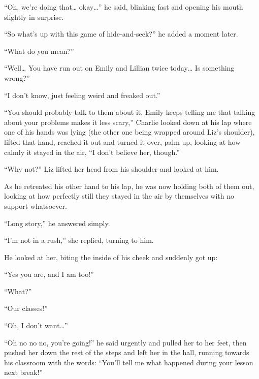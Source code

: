 “Oh, we’re doing that… okay…” he said, blinking fast and opening his mouth slightly in surprise.

“So what’s up with this game of hide-and-seek?” he added a moment later.

“What do you mean?”

“Well… You have run out on Emily and Lillian twice today… Is something wrong?”

“I don’t know, just feeling weird and freaked out.”

“You should probably talk to them about it, Emily keeps telling me that talking about your problems makes it less scary,” Charlie looked down at his lap where one of his hands was lying (the other one being wrapped around Liz’s shoulder), lifted that hand, reached it out and turned it over, palm up, looking at how calmly it stayed in the air, “I don’t believe her, though.”

“Why not?” Liz lifted her head from his shoulder and looked at him.

As he retreated his other hand to his lap, he was now holding both of them out, looking at how perfectly still they stayed in the air by themselves with no support whatsoever.

“Long story,” he answered simply.

“I’m not in a rush,” she replied, turning to him.

He looked at her, biting the inside of his cheek and suddenly got up:

“Yes you are, and I am too!”

“What?”

“Our classes!”

“Oh, I don’t want…”

“Oh no no no, you’re going!” he said urgently and pulled her to her feet, then pushed her down the rest of the steps and left her in the hall, running towards his classroom with the words: “You’ll tell me what happened during your lesson next break!”